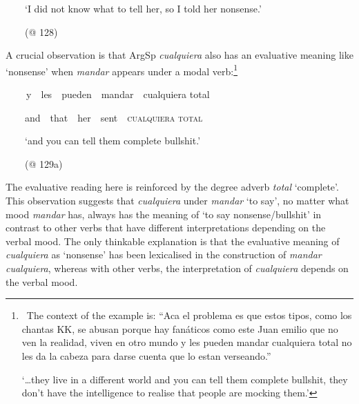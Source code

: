 \begin{styleStandard}
\ \ \ \ ‘I did not know what to tell her, so I told her nonsense.’
\end{styleStandard}

\begin{styleStandard}
\ \ \ \ (@ 128)
\end{styleStandard}

\begin{styleStandard}
A crucial observation is that ArgSp \textit{cualquiera} also has an evaluative meaning like ‘nonsense’ when \textit{mandar} appears under a modal verb:\footnote{\ The context of the example is: “Aca el problema es que estos tipos, como los chantas KK, se abusan porque hay fanáticos como este Juan emilio que no ven la realidad, viven en otro mundo y les pueden mandar cualquiera total no les da la cabeza para darse cuenta que lo estan verseando.”\par ‘…they live in a different world and you can tell them complete bullshit, they don’t have the intelligence to realise that people are mocking them.’}
\end{styleStandard}

\begin{styleStandard}
\textbf{\ \ }\ \ y\ \ les\ \ pueden\ \ mandar\ \ cualquiera total\ \ 
\end{styleStandard}

\begin{styleStandard}
\ \ \ \ and\ \ that\ \ her\ \ sent\ \ \textsc{cualquiera total}
\end{styleStandard}

\begin{styleStandard}
\ \ \ \ ‘and you can tell them complete bullshit.’
\end{styleStandard}

\begin{styleStandard}
\ \ \ \ (@ 129a)
\end{styleStandard}

\begin{styleStandard}
The evaluative reading here is reinforced by the degree adverb \textit{total} ‘complete’. This observation suggests that \textit{cualquiera} under \textit{mandar} ‘to say’, no matter what mood \textit{mandar} has, always has the meaning of ‘to say nonsense/bullshit’ in contrast to other verbs that have different interpretations depending on the verbal mood. The only thinkable explanation is that the evaluative meaning of \textit{cualquiera} as ‘nonsense’ has been lexicalised in the construction of \textit{mandar cualquiera}, whereas with other verbs, the interpretation of \textit{cualquiera} depends on the verbal mood. 
\end{styleStandard}

